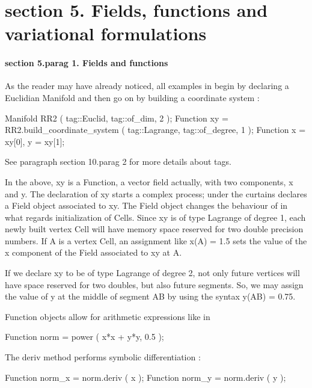 \section{\numb section 5. Fields, functions and variational formulations}


\paragraph{\numb section 5.\numb parag 1. Fields and functions}

As the reader may have already noticed, all examples in {\maniFEM} begin by declaring a
Euclidian {\codett Manifold} and then go on by building a coordinate system :

\verbatim
   Manifold RR2 ( tag::Euclid, tag::of_dim, 2 );
   Function xy = RR2.build_coordinate_system ( tag::Lagrange, tag::of_degree, 1 );
   Function x = xy[0],  y = xy[1];
\endverbatim

See paragraph \numb section 10.\numb parag 2 for more details about tags.

In the above, {\codett xy} is a {\codett Function}, a vector field actually, with two components,
{\codett x} and {\codett y}.
The declaration of {\codett xy} starts a complex process; under the curtains {\maniFEM} declares
a {\codett Field} object associated to {\codett xy}.
The {\codett Field} object changes the behaviour of {\maniFEM} in what regards initialization of
{\codett Cell}s.
Since {\codett xy} is of type Lagrange of degree 1, each newly built vertex {\codett Cell}
will have memory space reserved for two {\codett double} precision numbers.
If {\codett A} is a vertex {\codett Cell}, an assignment like {\codett x(A) = 1.5}
sets the value of the {\codett x} component of the {\codett Field} associated to {\codett xy}
at {\codett A}.

If we declare {\codett xy} to be of type Lagrange of degree 2, not only future vertices will
have space reserved for two {\codett double}s, but also future segments.
So, we may assign the value of {\codett y} at the middle of segment {\codett AB} by using
the syntax {\codett y(AB) = 0.75}.

{\codett Function} objects allow for arithmetic expressions like in

\verbatim
   Function norm = power ( x*x + y*y, 0.5 );
\endverbatim

The {\codett deriv} method performs symbolic differentiation :

\verbatim
   Function norm_x = norm.deriv ( x );
   Function norm_y = norm.deriv ( y );
\endverbatim

